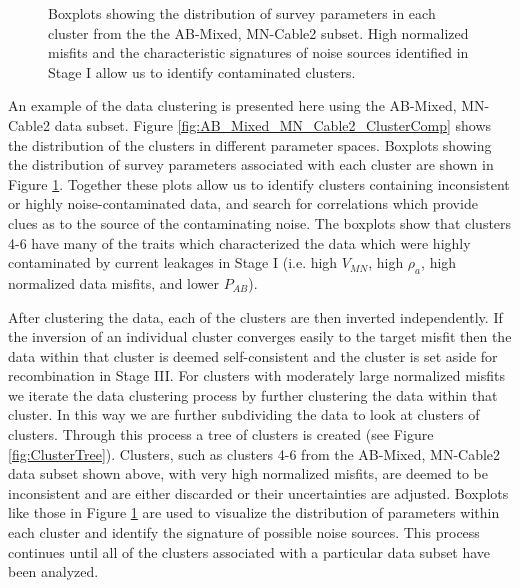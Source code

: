 \documentclass[final,authoryear,5p,times,twocolumn]{elsarticle}
\begin{document}
\begin{figure} [!ht]
\begin{center}
{       } %
    \end{center}
\caption{Boxplots showing the distribution of survey parameters in each cluster from the the AB-Mixed, MN-Cable2 subset. High normalized misfits and the characteristic signatures of noise sources identified in Stage I allow us to identify contaminated clusters.}
\label{fig:AB_Mixed_MN_Cable2_Cluster_PropBoxPlots}
\end{figure}

An example of the data clustering is presented here using the AB-Mixed, MN-Cable2 data subset. Figure \ref{fig:AB_Mixed_MN_Cable2_ClusterComp} shows the distribution of the clusters in different parameter spaces. Boxplots showing the distribution of survey parameters associated with each cluster are shown in Figure \ref{fig:AB_Mixed_MN_Cable2_Cluster_PropBoxPlots}. Together these plots allow us to identify clusters containing inconsistent or highly noise-contaminated data, and search for correlations which provide clues as to the source of the contaminating noise. The boxplots show that clusters 4-6 have many of the traits which characterized the data which were highly contaminated by current leakages in Stage I (i.e. high $V_{MN}$, high $\rho_a$, high normalized data misfits, and lower $P_{AB}$).

After clustering the data, each of the clusters are then inverted independently. If the inversion of an individual cluster converges easily to the target misfit then the data within that cluster is deemed self-consistent and the cluster is set aside for recombination in Stage III. For clusters with moderately large normalized misfits we iterate the data clustering process by further clustering the data within that cluster. In this way we are further subdividing the data to look at clusters of clusters. Through this process a tree of clusters is created (see Figure \ref{fig:ClusterTree}). Clusters, such as clusters 4-6 from the AB-Mixed, MN-Cable2 data subset shown above, with very high normalized misfits, are deemed to be inconsistent and are either discarded or their uncertainties are adjusted. Boxplots like those in Figure \ref{fig:AB_Mixed_MN_Cable2_Cluster_PropBoxPlots} are used to visualize the distribution of parameters within each cluster and identify the signature of possible noise sources. This process continues until all of the clusters associated with a particular data subset have been analyzed.
\end{document}
